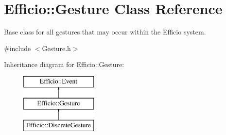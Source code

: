 \hypertarget{class_efficio_1_1_gesture}{}\section{Efficio\+:\+:Gesture Class Reference}
\label{class_efficio_1_1_gesture}


Base class for all gestures that may occur within the Efficio system.  




{\ttfamily \#include $<$Gesture.\+h$>$}

Inheritance diagram for Efficio\+:\+:Gesture\+:\begin{figure}[H]
\begin{center}
\leavevmode
\includegraphics[height=3.000000cm]{class_efficio_1_1_gesture}
\end{center}
\end{figure}
